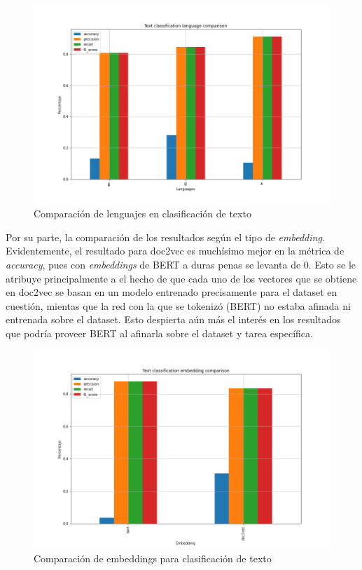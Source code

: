 \begin{figure}
    \centering
    \includegraphics[width = \textwidth]{results/Classification/lang_comparison.png}
    \caption{Comparación de lenguajes en clasificación de texto}
    \label{fig:lang_class_comp}
\end{figure}

Por su parte, la comparación de los resultados según el tipo de \textit{embedding}. Evidentemente, el resultado para doc2vec es muchísimo mejor en la métrica de \textit{accuracy}, pues con \textit{embeddings} de BERT a duras penas se levanta de 0. Esto se le atribuye principalmente a el hecho de que cada uno de los vectores que se obtiene en doc2vec se basan en un modelo entrenado precisamente para el dataset en cuestión, mientas que la red con la que se tokenizó (BERT) no estaba afinada ni entrenada sobre el dataset. Esto despierta aún más el interés en los resultados que podría proveer BERT al afinarla sobre el dataset y tarea específica.

\begin{figure}
    \centering
    \includegraphics[width=\textwidth]{results/Classification/embedding.png}
    \caption{Comparación de embeddings para clasificación de texto}
    \label{fig:my_label}
\end{figure}

